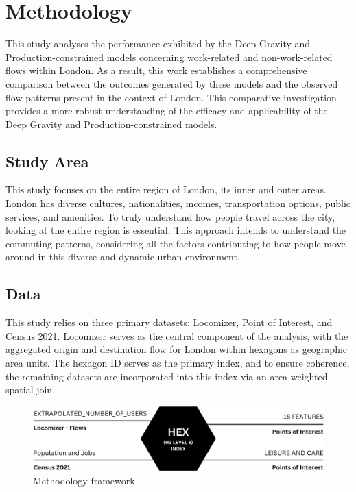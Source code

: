 \chapter{Methodology}
\label{chapterlabel3}

This study analyses the performance exhibited by the Deep Gravity and Production-constrained models concerning work-related and non-work-related flows within London. As a result, this work establishes a comprehensive comparison between the outcomes generated by these models and the observed flow patterns present in the context of London. This comparative investigation provides a more robust understanding of the efficacy and applicability of the Deep Gravity and Production-constrained models.




    \section{Study Area}

This study focuses on the entire region of London,  its inner and outer areas. London has diverse cultures, nationalities, incomes, transportation options, public services, and amenities. To truly understand how people travel across the city, looking at the entire region is essential. This approach intends to understand the commuting patterns, considering all the factors contributing to how people move around in this diverse and dynamic urban environment.



    \section{Data}

This study relies on three primary datasets: Locomizer, Point of Interest, and Census 2021. Locomizer serves as the central component of the analysis, with the aggregated origin and destination flow for London within hexagons as geographic area units. The hexagon ID serves as the primary index, and to ensure coherence, the remaining datasets are incorporated into this index via an area-weighted spatial join.

    \begin{figure}[H]
        \centering
        \includegraphics[width=12cm]{Images/framework.png}
        \caption{Methodology framework}
        \label{fig: framework}
    \end{figure}


